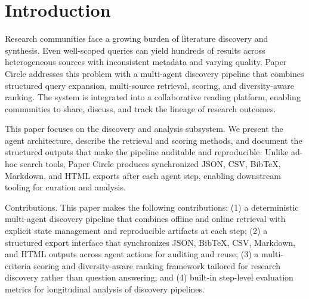 \section{Introduction}
Research communities face a growing burden of literature discovery and synthesis. Even well-scoped queries can yield hundreds of results across heterogeneous sources with inconsistent metadata and varying quality. Paper Circle addresses this problem with a multi-agent discovery pipeline that combines structured query expansion, multi-source retrieval, scoring, and diversity-aware ranking. The system is integrated into a collaborative reading platform, enabling communities to share, discuss, and track the lineage of research outcomes.

This paper focuses on the discovery and analysis subsystem. We present the agent architecture, describe the retrieval and scoring methods, and document the structured outputs that make the pipeline auditable and reproducible. Unlike ad-hoc search tools, Paper Circle produces synchronized JSON, CSV, BibTeX, Markdown, and HTML exports after each agent step, enabling downstream tooling for curation and analysis.

Contributions. This paper makes the following contributions: (1) a deterministic multi-agent discovery pipeline that combines offline and online retrieval with explicit state management and reproducible artifacts at each step; (2) a structured export interface that synchronizes JSON, BibTeX, CSV, Markdown, and HTML outputs across agent actions for auditing and reuse; (3) a multi-criteria scoring and diversity-aware ranking framework tailored for research discovery rather than question answering; and (4) built-in step-level evaluation metrics for longitudinal analysis of discovery pipelines.
